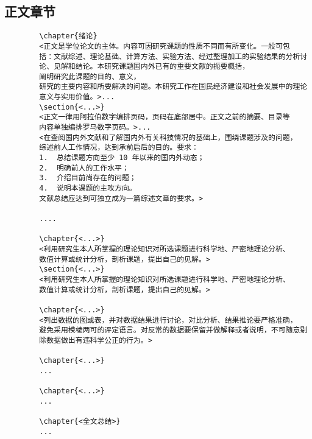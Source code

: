 \documentclass[figurelist,tablelist,algorithmlist,nomlist,masters]{seuthesix}
\begin{document}
	\subsection{正文章节}
	{\color{magenta}
		\begin{verbatim}
		\chapter{绪论}
		<正文是学位论文的主体。内容可因研究课题的性质不同而有所变化。一般可包
		括：文献综述、理论基础、计算方法、实验方法、经过整理加工的实验结果的分析讨
		论、见解和结论。本研究课题国内外已有的重要文献的扼要概括，
		阐明研究此课题的目的、意义，
		研究的主要内容和所要解决的问题。本研究工作在国民经济建设和社会发展中的理论
		意义与实用价值。>...
		\section{<...>}
		<正文一律用阿拉伯数字编排页码，页码在底部居中。正文之前的摘要、目录等
		内容单独编排罗马数字页码。>...
		<在查阅国内外文献和了解国内外有关科技情况的基础上，围绕课题涉及的问题，
		综述前人工作情况，达到承前启后的目的。要求：
		1.  总结课题方向至少 10 年以来的国内外动态；
		2.  明确前人的工作水平；
		3.  介绍目前尚存在的问题；
		4.  说明本课题的主攻方向。
		文献总结应达到可独立成为一篇综述文章的要求。>
		
		....
		
		\chapter{<...>}
		<利用研究生本人所掌握的理论知识对所选课题进行科学地、严密地理论分析、
		数值计算或统计分析，剖析课题，提出自己的见解。>
		\section{<...>}
		<利用研究生本人所掌握的理论知识对所选课题进行科学地、严密地理论分析、
		数值计算或统计分析，剖析课题，提出自己的见解。>
		
		\chapter{<...>}
		<列出数据的图或表，并对数据结果进行讨论，对比分析、结果推论要严格准确，
		避免采用模棱两可的评定语言。对反常的数据要保留并做解释或者说明，不可随意剔
		除数据做出有违科学公正的行为。>
		
		\chapter{<...>}
		...
		
		\chapter{<...>}
		...
		
		\chapter{<全文总结>}
		...
		
		\end{verbatim}
	}
	
\end{document}
